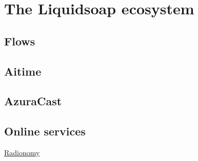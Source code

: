 \chapter{The Liquidsoap ecosystem}
\section{Flows}

\section{Aitime}

\section{AzuraCast}

\section{Online services}
\href{https://www.radionomy.com}{Radionomy}